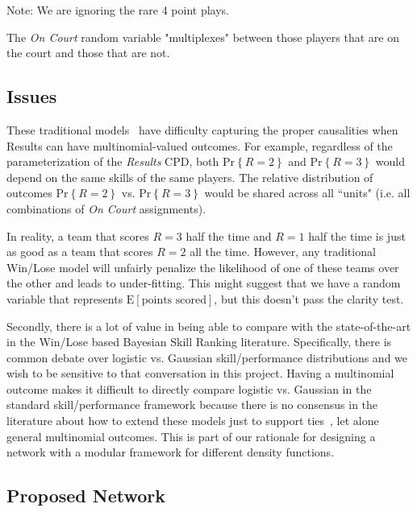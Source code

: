 \documentclass[10pt,twocolumn]{article}
\newcommand{\prb}[1]{\ensuremath{  \mathrm{Pr}\left\{ #1 \right\}  }}
\newcommand{\Elin}[1]{\ensuremath{     \mathrm{E}\left[ #1 \right]   }}
\begin{document}
Note: We are ignoring the rare 4 point plays. 

The \emph{On Court} random variable "multiplexes" between those players that are on the court and those that are not.

\subsection{Issues}
\label{sec:badnetwork}
These traditional models~\cite{herbrich2007trueskilltm} have difficulty capturing the proper causalities when Results can have multinomial-valued outcomes.
For example, regardless of the parameterization of the \emph{Results} CPD, both $\prb{ R = 2}$ and $\prb{R= 3}$ would depend on the same skills of the same players.
The relative distribution of outcomes $\prb{R = 2}$ vs. $\prb{R = 3}$ would be shared across all ``units" (i.e. all combinations of \emph{On Court} assignments).

In reality, a team that scores $R=3$ half the time and $R=1$ half the time is just as good as a team that scores $R=2$ all the time.
However, any traditional Win/Lose model will unfairly penalize the likelihood of one of these teams over the other and leads to under-fitting.
This might suggest that we have a random variable that represents $\Elin{\textrm{points scored}}$, but this doesn't pass the clarity test.

Secondly, there is a lot of value in being able to compare with the state-of-the-art in the Win/Lose based Bayesian Skill Ranking literature.
Specifically, there is common debate over logistic vs. Gaussian skill/performance distributions and we wish to be sensitive to that conversation in this project.
Having a multinomial outcome makes it difficult to directly compare logistic vs. Gaussian in the standard skill/performance framework because there is no consensus in the literature about how to extend these models just to support ties~\cite{hunter2004mm}, let alone general multinomial outcomes. This is part of our rationale for designing a network with a modular framework for different density functions.

\subsection{Proposed Network}
\label{sec:goodnetwork}
\end{document}
